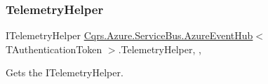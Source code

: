 \subsubsection{\texorpdfstring{Telemetry\+Helper}{TelemetryHelper}}
{\footnotesize\ttfamily I\+Telemetry\+Helper \hyperlink{classCqrs_1_1Azure_1_1ServiceBus_1_1AzureEventHub}{Cqrs.\+Azure.\+Service\+Bus.\+Azure\+Event\+Hub}$<$ T\+Authentication\+Token $>$.Telemetry\+Helper\hspace{0.3cm}{\ttfamily [get]}, {\ttfamily [set]}, {\ttfamily [protected]}}



Gets the I\+Telemetry\+Helper. 

